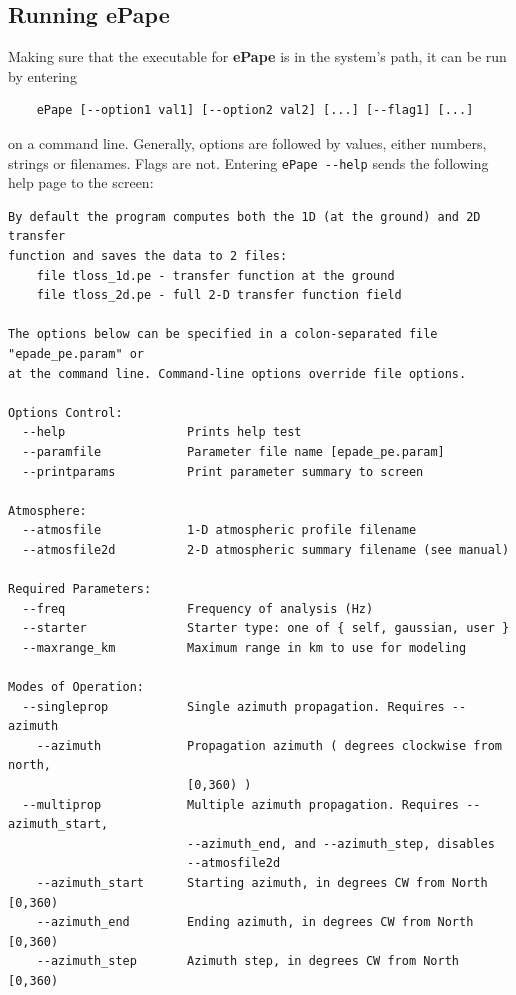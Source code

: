 \subsection{Running ePape}
\label{sec: running ePape}

Making sure that the executable for {\bf ePape} is in the system's path, it can be run by entering 
\begin{verbatim} 
    ePape [--option1 val1] [--option2 val2] [...] [--flag1] [...] 
\end{verbatim}
on a command line. Generally, options are followed by values, either numbers, strings or filenames. Flags are not. 
Entering \verb"ePape --help" sends the following help page to the screen:

\begin{verbatim}
By default the program computes both the 1D (at the ground) and 2D transfer
function and saves the data to 2 files:
    file tloss_1d.pe - transfer function at the ground
    file tloss_2d.pe - full 2-D transfer function field

The options below can be specified in a colon-separated file "epade_pe.param" or
at the command line. Command-line options override file options.

Options Control:
  --help                 Prints help test
  --paramfile            Parameter file name [epade_pe.param]
  --printparams          Print parameter summary to screen

Atmosphere:
  --atmosfile            1-D atmospheric profile filename
  --atmosfile2d          2-D atmospheric summary filename (see manual)

Required Parameters:
  --freq                 Frequency of analysis (Hz)
  --starter              Starter type: one of { self, gaussian, user }
  --maxrange_km          Maximum range in km to use for modeling

Modes of Operation:
  --singleprop           Single azimuth propagation. Requires --azimuth
    --azimuth            Propagation azimuth ( degrees clockwise from north,
                         [0,360) )
  --multiprop            Multiple azimuth propagation. Requires --azimuth_start,
                         --azimuth_end, and --azimuth_step, disables
                         --atmosfile2d
    --azimuth_start      Starting azimuth, in degrees CW from North [0,360)
    --azimuth_end        Ending azimuth, in degrees CW from North [0,360)
    --azimuth_step       Azimuth step, in degrees CW from North [0,360)


\end{verbatim}
